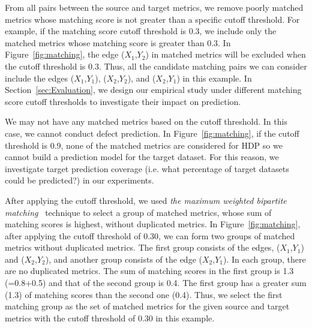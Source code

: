 From all pairs between the source and target metrics, we remove poorly matched
metrics whose matching score is not greater than a specific cutoff threshold.
For example, if the matching score cutoff threshold is 0.3, we include only the
matched metrics whose matching score is greater than 0.3. In
Figure~\ref{fig:matching}, the edge ($X_1$,$Y_2$) in matched metrics will be
excluded when the cutoff threshold is 0.3. Thus, all the candidate matching
pairs we can consider include the edges ($X_1$,$Y_1$), ($X_2$,$Y_2$), and
($X_2$,$Y_1$) in this example.
In Section~\ref{sec:Evaluation}, we design our empirical study under different
matching score cutoff thresholds to investigate their impact on prediction.

We may not have any matched metrics based on the cutoff threshold. In this
case, we cannot conduct defect prediction. In
Figure~\ref{fig:matching}, if the cutoff threshold is 0.9, none of the matched
metrics are considered for HDP so we cannot build a prediction model for the target
dataset. For this reason, we investigate target prediction coverage (i.e.
what percentage of target datasets could be predicted?) in
our experiments.

After applying the cutoff threshold, we
used {\em the maximum weighted bipartite matching}~\cite{Matouek06} technique to
select a group of matched metrics, whose sum of matching scores is highest,
without duplicated metrics.
In Figure~\ref{fig:matching}, after applying the cutoff threshold of 0.30, we
can form two groups of matched metrics without duplicated metrics. The first
group consists of the edges, ($X_1$,$Y_1$) and ($X_2$,$Y_2$), and another group
consists of the edge ($X_2$,$Y_1$). In each group, there are no duplicated
metrics. The sum of matching scores in the first group is 1.3 (=0.8+0.5) and that of the second
group is 0.4.
The first group has a greater sum (1.3) of matching scores than the
second one (0.4). Thus, we select the first matching group as the set of
matched metrics for the given source and target metrics with the cutoff
threshold of 0.30 in this example.
 
% 


